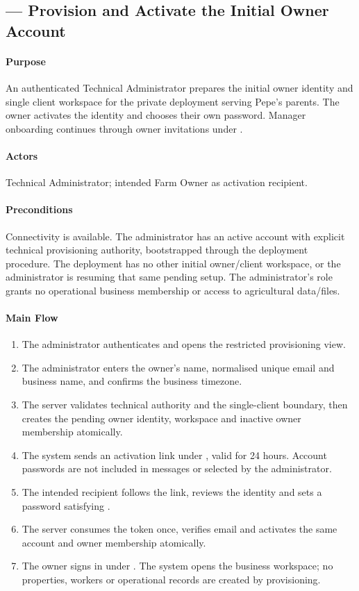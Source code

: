 \subsection{ --- Provision and Activate the Initial Owner Account}
\label{uc:register-owner}\label{uc:01}
\paragraph{Purpose}
An authenticated Technical Administrator prepares the initial owner identity and
single client workspace for the private deployment serving Pepe's parents. The
owner activates the identity and chooses their own password. Manager onboarding
continues through owner invitations under .
\paragraph{Actors}
Technical Administrator; intended Farm Owner as activation recipient.
\paragraph{Preconditions}
Connectivity is available. The administrator has an active account with explicit
technical provisioning authority, bootstrapped through the deployment procedure.
The deployment has no other initial owner/client workspace, or the administrator
is resuming that same pending setup. The administrator's role grants no operational
business membership or access to agricultural data/files.
\paragraph{Main Flow}
\begin{enumerate}
\item The administrator authenticates and opens the restricted provisioning view.
\item The administrator enters the owner's name, normalised unique email and business name, and confirms the business timezone.
\item The server validates technical authority and the single-client boundary, then creates the pending owner identity, workspace and inactive owner membership atomically.
\item The system sends an activation link under , valid for 24 hours. Account passwords are not included in messages or selected by the administrator.
\item The intended recipient follows the link, reviews the identity and sets a password satisfying .
\item The server consumes the token once, verifies email and activates the same account and owner membership atomically.
\item The owner signs in under . The system opens the business workspace; no properties, workers or operational records are created by provisioning.
\end{enumerate}
